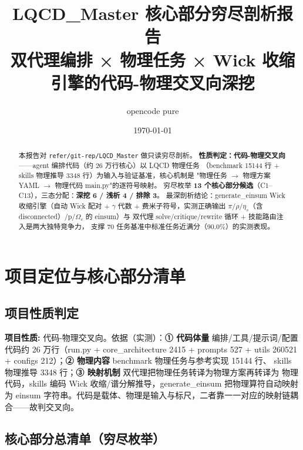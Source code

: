 \documentclass[UTF8]{ctexart}
\title{LQCD\_Master 核心部分穷尽剖析报告\\{\large 双代理编排 × 物理任务 × Wick 收缩引擎的代码-物理交叉向深挖}}
\author{opencode pure}
\date{\today}
\begin{document}
\maketitle

\begin{abstract}
本报告对 \texttt{refer/git-rep/LQCD\_Master} 做只读穷尽剖析。
\textbf{性质判定：代码-物理交叉向}——agent 编排代码（约 26 万行核心）以 LQCD 物理任务
（benchmark 15144 行 + skills 物理推导 3348 行）为输入与验证基准，核心机制是
"物理任务 $\rightarrow$ 物理方案 YAML $\rightarrow$ 物理代码 main.py"的逐符号映射。
穷尽枚举 \textbf{13 个核心部分候选}（C1--C13），三态分配：\textbf{深挖 6 / 浅析 4 / 排除 3}。
最深剖析结论：\textcolor{algo}{generate\_einsum Wick 收缩引擎}（自动 Wick 配对 + $\gamma$ 代数 +
费米子符号，实测正确输出 $\pi/\rho/\eta_s$（含 disconnected）/p/$\Omega_c$ 的 einsum）与
\textcolor{algo}{双代理 solve/critique/rewrite 循环 + 技能路由注入}是两大独特竞争力，
支撑 70 任务基准中标准任务近满分（90.0\%）的实测表现。
\end{abstract}

\tableofcontents

\section{项目定位与核心部分清单}

\subsection{项目性质判定}

\begin{keybox}
\textbf{项目性质:} \textcolor{phys}{代码-物理交叉向}。依据（实测）：\textbf{① 代码体量}
编排/工具/提示词/配置代码约 26 万行（run.py + core\_architecture 2415 + prompts 527 +
utils 260521 + configs 212）；\textbf{② 物理内容} benchmark 物理任务与参考实现 15144 行、
skills 物理推导 3348 行；\textbf{③ 映射机制} 双代理把物理任务转译为物理方案再转译为
物理代码，skills 编码 Wick 收缩/谱分解推导，generate\_einsum 把物理算符自动映射为 einsum
字符串。代码是载体、物理是输入与标尺，二者靠一一对应的映射链耦合——故判交叉向。
\end{keybox}

\subsection{核心部分总清单（穷尽枚举）}
\end{document}
